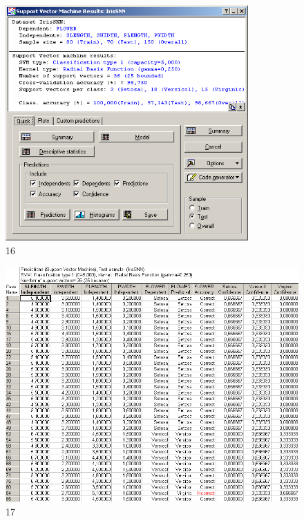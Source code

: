 \begin{figure}[!h]
  \centering

  \includegraphics[height=9cm]
  {inc/ex_16.PNG}

  \caption{16}

  \label{fig:16}
\end{figure}

\begin{figure}[!hp]
  \centering

  \includegraphics[width=14cm]
  {inc/ex_17.PNG}

  \caption{17}

  \label{fig:17}
\end{figure}

